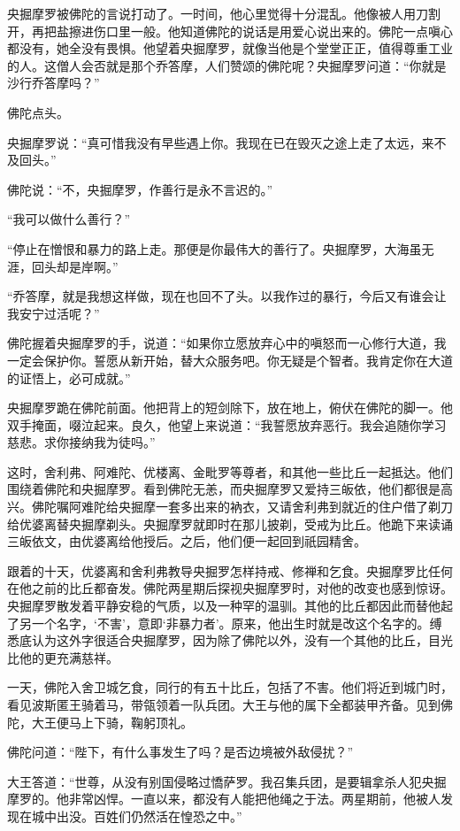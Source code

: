 \documentclass[12pt,twoside,openany]{book}
\begin{document}
央掘摩罗被佛陀的言说打动了。一时间，他心里觉得十分混乱。他像被人用刀割开，再把盐擦进伤口里一般。他知道佛陀的说话是用爱心说出来的。佛陀一点嗔心都没有，她全没有畏惧。他望着央掘摩罗，就像当他是个堂堂正正，值得尊重工业的人。这僧人会否就是那个乔答摩，人们赞颂的佛陀呢？央掘摩罗问道：“你就是沙行乔答摩吗？”

佛陀点头。

央掘摩罗说：“真可惜我没有早些遇上你。我现在已在毁灭之途上走了太远，来不及回头。”

佛陀说：“不，央掘摩罗，作善行是永不言迟的。”

“我可以做什么善行？”

“停止在憎恨和暴力的路上走。那便是你最伟大的善行了。央掘摩罗，大海虽无涯，回头却是岸啊。”

“乔答摩，就是我想这样做，现在也回不了头。以我作过的暴行，今后又有谁会让我安宁过活呢？”

佛陀握着央掘摩罗的手，说道：“如果你立愿放弃心中的嗔怒而一心修行大道，我一定会保护你。誓愿从新开始，替大众服务吧。你无疑是个智者。我肯定你在大道的证悟上，必可成就。”

央掘摩罗跪在佛陀前面。他把背上的短剑除下，放在地上，俯伏在佛陀的脚一。他双手掩面，啜泣起来。良久，他望上来说道：“我誓愿放弃恶行。我会追随你学习慈悲。求你接纳我为徒吗。”

这时，舍利弗、阿难陀、优楼离、金毗罗等尊者，和其他一些比丘一起抵达。他们围绕着佛陀和央掘摩罗。看到佛陀无恙，而央掘摩罗又爱持三皈依，他们都很是高兴。佛陀嘱阿难陀给央掘摩一套多出来的衲衣，又请舍利弗到就近的住户借了剃刀给优婆离替央掘摩剃头。央掘摩罗就即时在那儿披剃，受戒为比丘。他跪下来读诵三皈依文，由优婆离给他授后。之后，他们便一起回到祇园精舍。

跟着的十天，优婆离和舍利弗教导央掘罗怎样持戒、修禅和乞食。央掘摩罗比任何在他之前的比丘都奋发。佛陀两星期后探视央掘摩罗时，对他的改变也感到惊讶。央掘摩罗散发着平静安稳的气质，以及一种罕的温驯。其他的比丘都因此而替他起了另一个名字，‘不害’，意即‘非暴力者’。原来，他出生时就是改这个名字的。缚悉底认为这外字很适合央掘摩罗，因为除了佛陀以外，没有一个其他的比丘，目光比他的更充满慈祥。

一天，佛陀入舍卫城乞食，同行的有五十比丘，包括了不害。他们将近到城门时，看见波斯匿王骑着马，带瓴领着一队兵团。大王与他的属下全都装甲齐备。见到佛陀，大王便马上下骑，鞠躬顶礼。

佛陀问道：“陛下，有什么事发生了吗？是否边境被外敌侵扰？”

大王答道：“世尊，从没有别国侵略过憍萨罗。我召集兵团，是要辑拿杀人犯央掘摩罗的。他非常凶悍。一直以来，都没有人能把他绳之于法。两星期前，他被人发现在城中出没。百姓们仍然活在惶恐之中。”
\end{document}
